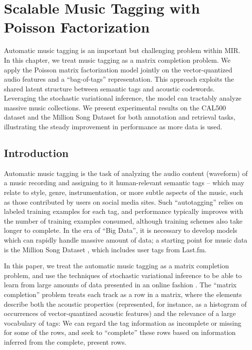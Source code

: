 
\chapter{Scalable Music Tagging with Poisson Factorization}\label{chpt:tagging}

Automatic music tagging is an important but challenging problem within \gls{MIR}. In this chapter, we treat music tagging as a matrix completion problem. We apply the Poisson matrix factorization model jointly on the vector-quantized audio features and a ``bag-of-tags'' representation. This approach exploits the shared latent structure between semantic tags and acoustic codewords. Leveraging the stochastic variational inference, the model can tractably analyze massive music collections. We present experimental results on the CAL500 dataset and the Million Song Dataset for both annotation and retrieval tasks, illustrating the steady improvement in performance as more data is used. 
%
\section{Introduction}\label{chpt:tagging:sec:intro}

Automatic music tagging is the task of analyzing the audio content (waveform) of a music recording and assigning to it human-relevant semantic tags \citep{Turnbull_SemanticAudio} -- which may relate to style, genre, instrumentation, or more subtle aspects of the music, such as those contributed by users on social media sites.  Such ``autotagging'' \citep{eck2007automatic} relies on labeled training examples for each tag, and performance typically improves with the number of training examples consumed, although training schemes also take longer to complete.  In the era of ``Big Data'', it is necessary to develop models which can rapidly handle massive amount of data; a starting point for music data is the Million Song Dataset \citep{bertin2011million}, which includes user tags from Last.fm.

In this paper, we treat the automatic music tagging as a matrix completion problem, and use the 
techniques of stochastic variational inference to be able to learn from large amounts of data presented 
in an online fashion \citep{hoffman2013stochastic}.  The ``matrix completion'' problem treats each track as a row in a matrix, where the elements describe both the acoustic properties (represented, for instance, as a histogram of occurrences of vector-quantized acoustic features) and the relevance of a large vocabulary of tags: We can regard the tag information as incomplete or missing for some of the rows, and seek to ``complete'' these rows based on information inferred from the complete, present rows.

